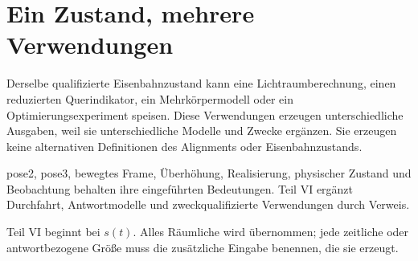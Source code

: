 \section{Ein Zustand, mehrere Verwendungen}

Derselbe qualifizierte Eisenbahnzustand kann eine Lichtraumberechnung, einen
reduzierten Querindikator, ein Mehrkörpermodell oder ein
Optimierungsexperiment speisen. Diese Verwendungen erzeugen unterschiedliche
Ausgaben, weil sie unterschiedliche Modelle und Zwecke ergänzen. Sie erzeugen
keine alternativen Definitionen des Alignments oder Eisenbahnzustands.

\begin{principle}
pose2, pose3, bewegtes Frame, Überhöhung, Realisierung, physischer Zustand und
Beobachtung behalten ihre eingeführten Bedeutungen. Teil VI ergänzt
Durchfahrt, Antwortmodelle und zweckqualifizierte Verwendungen durch Verweis.
\end{principle}

\begin{summary}
Teil VI beginnt bei \(s(t)\). Alles Räumliche wird übernommen; jede zeitliche
oder antwortbezogene Größe muss die zusätzliche Eingabe benennen, die sie
erzeugt.
\end{summary}
